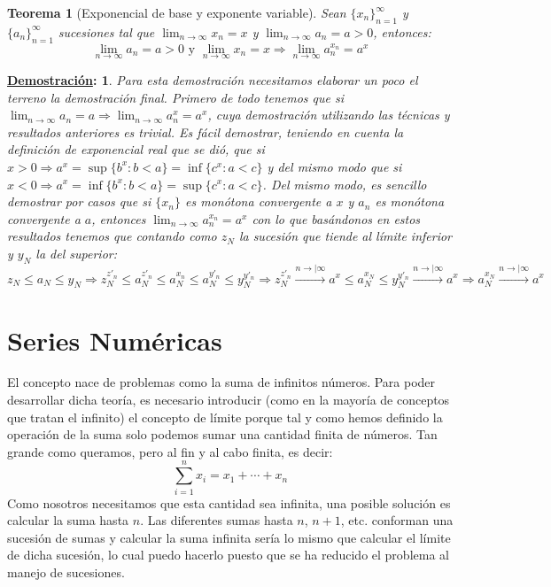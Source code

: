\documentclass[10pt,a4paper,openright]{book}
\theoremstyle{break}
\newtheorem*{theo}{Teorema}
\newtheorem*{demo}{\underline{Demostración}:}
\begin{document}
\begin{theo}[Exponencial de base y exponente variable]
Sean $\{x_n\}_{n=1}^\infty$ y $\{a_n\}_{n=1}^\infty$ sucesiones tal que $\lim_{n\rightarrow \infty}x_n = x$ y $\lim_{n\rightarrow\infty}a_n=a>0$, entonces:
$$\lim_{n\rightarrow\infty}a_n=a>0 \mbox{ y } \lim_{n\rightarrow\infty}x_n=x\Rightarrow \lim_{n\rightarrow\infty}a_n^{x_n}=a^x$$
\end{theo}
\begin{demo}
Para esta demostración necesitamos elaborar un poco el terreno la demostración final. Primero de todo tenemos que si $\lim_{n\rightarrow \infty} a_n=a\Rightarrow \lim_{n\rightarrow \infty}a_n^x=a^x$, cuya demostración utilizando las técnicas y resultados anteriores es trivial. Es fácil demostrar, teniendo en cuenta la definición de exponencial real que se dió, que si $x>0\Rightarrow a^x=\sup\{b^x: b<a\}=\inf\{c^x: a<c\}$ y del mismo modo que si $x<0\Rightarrow a^x=\inf\{b^x: b<a\}=\sup\{c^x: a<c\}$. Del mismo modo, es sencillo demostrar por casos que si $\{x_n\}$ es monótona convergente a $x$ y $a_n$ es monótona convergente a $a$, entonces $\lim_{n\rightarrow\infty} a_n^{x_n}=a^x$ con lo que basándonos en estos resultados tenemos que contando como $z_N$ la sucesión que tiende al límite inferior y $y_N$ la del superior:
$$z_N\leq a_N\leq y_N\Rightarrow z_N^{z'_n}\leq a_N^{z'_n}\leq a_N^{x_n}\leq a_N^{y'_n}\leq y_N^{y'_n}\Rightarrow z_N^{z'_n}\xrightarrow{n\rightarrow|\infty}a^x\leq a_N^{x_N}\leq y_N^{y'_n}\xrightarrow{n\rightarrow|\infty}a^x\Rightarrow a_N^{x_N}\xrightarrow{n\rightarrow|\infty}a^x$$
\end{demo}

\section{Series Numéricas}
El concepto nace de problemas como la suma de infinitos números. Para poder desarrollar dicha teoría, es necesario introducir (como en la mayoría de conceptos que tratan el infinito) el concepto de límite porque tal y como hemos definido la operación de la suma solo podemos sumar una cantidad finita de números. Tan grande como queramos, pero al fin y al cabo finita, es decir:
$$\sum_{i=1}^{n} x_i = x_1 + \cdots + x_n$$
Como nosotros necesitamos que esta cantidad sea infinita, una posible solución es calcular la suma hasta $n$. Las diferentes sumas hasta $n$, $n+1$, etc. conforman una sucesión de sumas y calcular la suma infinita sería lo mismo que calcular el límite de dicha sucesión, lo cual puedo hacerlo puesto que se ha reducido el problema al manejo de sucesiones.
\end{document}
